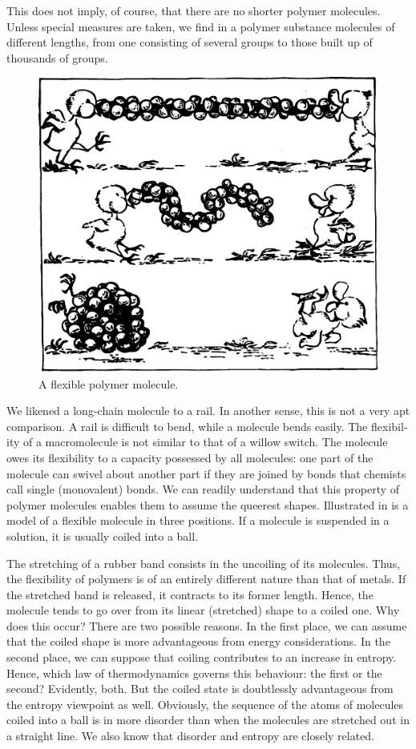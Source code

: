 This does not imply, of course, that there are no short­er polymer molecules. Unless special measures are taken, we find in a polymer substance molecules of different lengths, from one consisting of several groups to those built up of thousands of groups.

\begin{figure}[!ht]
\centering
\includegraphics[width=\textwidth]{figures/fig-09-02.pdf}
\caption{A flexible polymer molecule.}
\label{fig-9.2}
\end{figure}
We likened a long-chain molecule to a rail. In another sense, this is not a very apt comparison. A rail is diffi­cult to bend, while a molecule bends easily. The flexibil­ity of a macromolecule is not similar to that of a willow switch. The molecule owes its flexibility to a capacity possessed by all molecules: one part of the molecule can swivel about another part if they are joined by bonds that chemists call single (monovalent) bonds. We can readily understand that this property of polymer mol­ecules enables them to assume the queerest shapes. Illustrated in  is a model of a flexible molecule in three positions. If a molecule is suspended in a solution, it is usually coiled into a ball.

The stretching of a rubber band consists in the uncoiling of its molecules. Thus, the flexibility of polymers is of an entirely different nature than that of metals. If the stretched band is released, it contracts to its former length. Hence, the molecule tends to go over from its linear (stretched) shape to a coiled one. Why does this occur? There are two possible reasons. In the first place, we can assume that the coiled shape is more advantageous from energy considerations. In the second place, we can sup­pose that coiling contributes to an increase in entropy. Hence, which law of thermodynamics governs this be­haviour: the first or the second? Evidently, both. But the coiled state is doubtlessly advantageous from the entropy viewpoint as well. Obviously, the sequence of the atoms of molecules coiled into a ball is in more disorder than when the molecules are stretched out in a straight line. We also know that disorder and entropy are closely re­lated.


